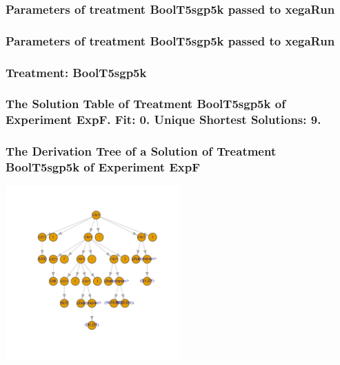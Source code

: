\documentclass[18pt,c]{beamer}
\begin{document}

 \begin{frame}
 \fontsize{8pt}{9pt}\selectfont
 \frametitle{  Parameters of treatment BoolT5sgp5k passed to xegaRun
 }

 \label{ExpFtParmTable026.tex}  
 \end{frame}


 \begin{frame}
 \fontsize{8pt}{9pt}\selectfont
 \frametitle{  Parameters of treatment BoolT5sgp5k passed to xegaRun
 }

 \label{ExpFtParmTable027.tex}  
 \end{frame}

 \begin{frame}
 \fontsize{8pt}{9pt}\selectfont
 \frametitle{ Treatment: BoolT5sgp5k }

 \label{ExpFStatsTable012.tex}  
 \end{frame}

 \begin{frame}
 \fontsize{8pt}{9pt}\selectfont
 \frametitle{ The Solution Table of Treatment BoolT5sgp5k of Experiment ExpF. Fit: 0. Unique Shortest Solutions: 9. }

 \label{ExpFSolutionTable006.tex}  
 \end{frame}

 \begin{frame}
 \frametitle{ The Derivation Tree of a Solution of Treatment BoolT5sgp5k of Experiment ExpF }
 \begin{center}
\includegraphics[width=0.5\textwidth, angle=0]
{ExpFDerivationTreeFigure006.pdf}
 \end{center}
 \label{report/ExpFDerivationTreeFigure006.pdf}  
 \end{frame}
\end{document}
